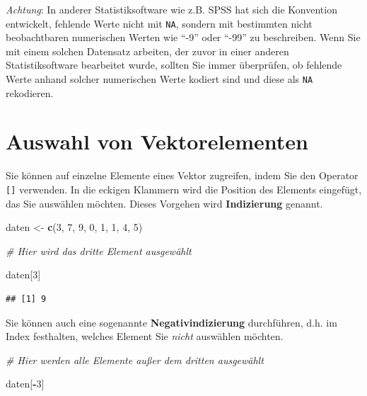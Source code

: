 \documentclass[
  ngerman,
]{book}
\newenvironment{Shaded}{\begin{snugshade}}{\end{snugshade}}
\newcommand{\CommentTok}[1]{\textcolor[rgb]{0.56,0.35,0.01}{\textit{#1}}}
\newcommand{\DecValTok}[1]{\textcolor[rgb]{0.00,0.00,0.81}{#1}}
\newcommand{\FunctionTok}[1]{\textcolor[rgb]{0.13,0.29,0.53}{\textbf{#1}}}
\newcommand{\NormalTok}[1]{#1}
\newcommand{\OtherTok}[1]{\textcolor[rgb]{0.56,0.35,0.01}{#1}}
\newcommand{\SpecialCharTok}[1]{\textcolor[rgb]{0.81,0.36,0.00}{\textbf{#1}}}
\begin{document}
\emph{Achtung}: In anderer Statistiksoftware wie z.B. SPSS hat sich die Konvention entwickelt, fehlende Werte nicht mit \texttt{NA}, sondern mit bestimmten nicht beobachtbaren numerischen Werten wie ``-9'' oder ``-99'' zu beschreiben. Wenn Sie mit einem solchen Datensatz arbeiten, der zuvor in einer anderen Statistiksoftware bearbeitet wurde, sollten Sie immer überprüfen, ob fehlende Werte anhand solcher numerischen Werte kodiert sind und diese als \texttt{NA} rekodieren.

\section{Auswahl von Vektorelementen}\label{auswahl-von-vektorelementen}

Sie können auf einzelne Elemente eines Vektor zugreifen, indem Sie den Operator \texttt{{[}{]}} verwenden. In die eckigen Klammern wird die Position des Elements eingefügt, das Sie auswählen möchten. Dieses Vorgehen wird \textbf{Indizierung} genannt.

\begin{Shaded}
\begin{Highlighting}[]
\NormalTok{daten }\OtherTok{\textless{}{-}} \FunctionTok{c}\NormalTok{(}\DecValTok{3}\NormalTok{, }\DecValTok{7}\NormalTok{, }\DecValTok{9}\NormalTok{, }\DecValTok{0}\NormalTok{, }\DecValTok{1}\NormalTok{, }\DecValTok{1}\NormalTok{, }\DecValTok{4}\NormalTok{, }\DecValTok{5}\NormalTok{)}

\CommentTok{\# Hier wird das dritte Element ausgewählt}

\NormalTok{daten[}\DecValTok{3}\NormalTok{]}
\end{Highlighting}
\end{Shaded}

\begin{verbatim}
## [1] 9
\end{verbatim}

Sie können auch eine sogenannte \textbf{Negativindizierung} durchführen, d.h. im Index festhalten, welches Element Sie \emph{nicht} auswählen möchten.

\begin{Shaded}
\begin{Highlighting}[]
\CommentTok{\# Hier werden alle Elemente außer dem dritten ausgewählt}

\NormalTok{daten[}\SpecialCharTok{{-}}\DecValTok{3}\NormalTok{]}
\end{Highlighting}
\end{Shaded}
\end{document}
